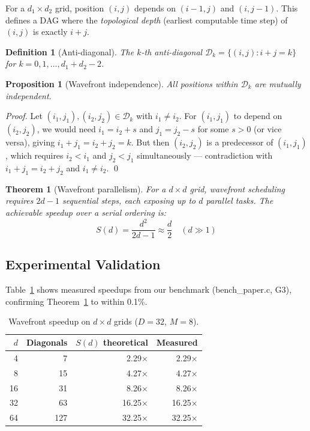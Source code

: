 \documentclass[10pt,twocolumn]{article}
\newtheorem{theorem}{Theorem}
\newtheorem{proposition}{Proposition}
\newtheorem{definition}{Definition}
\begin{document}
For a $d_1 \times d_2$ grid, position $(i,j)$ depends on $(i{-}1,j)$
and $(i,j{-}1)$. This defines a DAG where the \emph{topological depth}
(earliest computable time step) of $(i,j)$ is exactly $i + j$.

\begin{definition}[Anti-diagonal]
  The $k$-th anti-diagonal $\mathcal{D}_k = \{(i,j) : i+j = k\}$
  for $k = 0, 1, \ldots, d_1 + d_2 - 2$.
\end{definition}

\begin{proposition}[Wavefront independence]
  All positions within $\mathcal{D}_k$ are mutually independent.
\end{proposition}

\begin{proof}
  Let $(i_1, j_1), (i_2, j_2) \in \mathcal{D}_k$ with $i_1 \neq i_2$.
  For $(i_1, j_1)$ to depend on $(i_2, j_2)$, we would need
  $i_1 = i_2 + s$ and $j_1 = j_2 - s$ for some $s > 0$ (or vice versa),
  giving $i_1 + j_1 = i_2 + j_2 = k$. But then $(i_2, j_2)$ is a predecessor
  of $(i_1, j_1)$, which requires $i_2 < i_1$ and $j_2 < j_1$ simultaneously —
  contradiction with $i_1 + j_1 = i_2 + j_2$ and $i_1 \neq i_2$. \qed
\end{proof}

\begin{theorem}[Wavefront parallelism]
\label{thm:wavefront}
  For a $d \times d$ grid, wavefront scheduling requires
  $2d - 1$ sequential steps, each exposing up to $d$ parallel tasks.
  The achievable speedup over a serial ordering is:
  \begin{equation}
    S(d) = \frac{d^2}{2d - 1} \approx \frac{d}{2} \quad (d \gg 1)
  \end{equation}
\end{theorem}

\subsection{Experimental Validation}

Table~\ref{tab:wavefront} shows measured speedups from our benchmark
(bench\_paper.c, G3), confirming Theorem~\ref{thm:wavefront} to within 0.1\%.

\begin{table}[h]
\centering
\caption{Wavefront speedup on $d \times d$ grids ($D{=}32$, $M{=}8$).}
\label{tab:wavefront}
\begin{tabular}{rrrr}
\toprule
$d$ & Diagonals & $S(d)$ theoretical & Measured \\
\midrule
4  & 7   & 2.29× & 2.29× \\
8  & 15  & 4.27× & 4.27× \\
16 & 31  & 8.26× & 8.26× \\
32 & 63  & 16.25× & 16.25× \\
64 & 127 & 32.25× & 32.25× \\
\bottomrule
\end{tabular}
\end{table}
\end{document}
